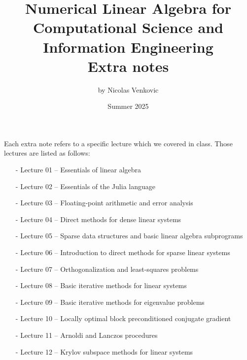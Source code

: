 \documentclass[letterpaper,10pt]{article}
\begin{document}
	
\title{Numerical Linear Algebra for Computational Science and Information Engineering\vspace{.3cm}\\
\large Extra notes}
\author{by Nicolas Venkovic}
\date{Summer 2025}
\maketitle

Each extra note refers to a specific lecture which we covered in class.
Those lectures are listed as follows:
\begin{itemize}
\item[-] Lecture 01 -- Essentials of linear algebra\vspace{-.15cm}
\item[-] Lecture 02 -- Essentials of the Julia language\vspace{-.15cm}
\item[-] Lecture 03 -- Floating-point arithmetic and error analysis\vspace{-.15cm}
\item[-] Lecture 04 -- Direct methods for dense linear systems\vspace{-.15cm}
\item[-] Lecture 05 -- Sparse data structures and basic linear algebra subprograms\vspace{-.15cm}
\item[-] Lecture 06 -- Introduction to direct methods for sparse linear systems\vspace{-.15cm}
\item[-] Lecture 07 -- Orthogonalization and least-squares problems\vspace{-.15cm}
\item[-] Lecture 08 -- Basic iterative methods for linear systems\vspace{-.15cm}
\item[-] Lecture 09 -- Basic iterative methods for eigenvalue problems\vspace{-.15cm}
\item[-] Lecture 10 -- Locally optimal block preconditioned conjugate gradient\vspace{-.15cm}
\item[-] Lecture 11 -- Arnoldi and Lanczos procedures\vspace{-.15cm}
\item[-] Lecture 12 -- Krylov subspace methods for linear systems\vspace{-.15cm}

\end{itemize}
\end{document}
